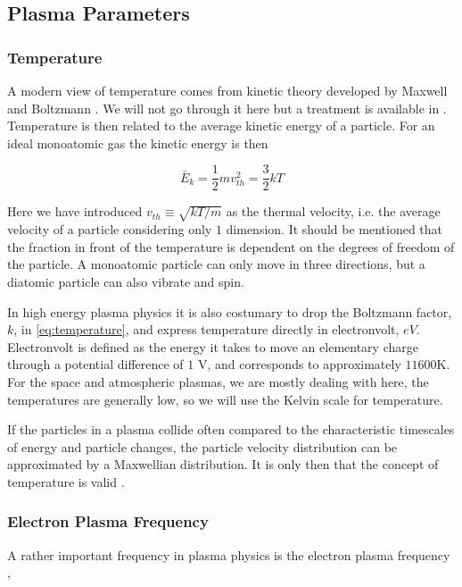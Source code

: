     \subsection{Plasma Parameters}
		\label{sec:parameters}
		\subsubsection{Temperature}
		A modern view of temperature comes from kinetic theory developed by
		Maxwell and Boltzmann \citep{swendsen_statistical_2006}. We will not go through it
		here but a treatment is available in \citet{goldston_introduction_1995}.
		Temperature is then related to the average kinetic energy of a particle.
		For an ideal monoatomic gas the kinetic energy is then

		\begin{equation}
			\bar{E}_k = \frac{1}{2} m v_{th}^2 = \frac{3}{2} kT \label{eq:temperature}
		\end{equation}

		Here we have introduced \(v_{th} \equiv  \sqrt{kT/m}\) as the thermal velocity, i.e.
		the average velocity of a particle considering only \(1\) dimension. It should be mentioned that the fraction in
		front of the temperature is dependent on the degrees of freedom of the particle.
		A monoatomic particle can only move in three directions, but a diatomic particle
		can also vibrate and spin.

		In high energy plasma physics it is also costumary to drop the Boltzmann factor, \(k\),
		in \cref{eq:temperature}, and express temperature directly in electronvolt, \(eV\).
		Electronvolt is defined as the energy it takes to move an elementary charge through
		a potential difference of \(1\) \si{\volt}, and corresponds to approximately
		\(11600 \si{\kelvin}\). For the space and atmospheric plasmas, we are mostly
		dealing with here, the temperatures are generally low, so we will use the Kelvin scale
		for temperature.

		If the particles in a plasma collide often compared to the characteristic timescales
		of energy and particle changes, the particle velocity distribution can be approximated
		by a Maxwellian distribution. It is only then that the concept of
		temperature is valid \citep{goldston_introduction_1995}.

		\subsubsection{Electron Plasma Frequency}
		A rather important frequency in plasma physics is the electron plasma frequency \citep{chen_introduction_1984},

